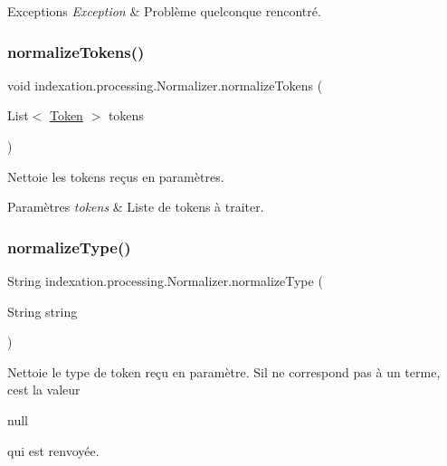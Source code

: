 \begin{DoxyExceptions}{Exceptions}
{\em Exception} & Problème quelconque rencontré. \\
\hline
\end{DoxyExceptions}
\mbox{\label{classindexation_1_1processing_1_1Normalizer_a83b6aafd2e8ed00107c9fcb677190005}} 
\subsubsection{\texorpdfstring{normalize\+Tokens()}{normalizeTokens()}}
{\footnotesize\ttfamily void indexation.\+processing.\+Normalizer.\+normalize\+Tokens (\begin{DoxyParamCaption}\item[{List$<$ \hyperlink{classindexation_1_1content_1_1Token}{Token} $>$}]{tokens }\end{DoxyParamCaption})}

Nettoie les tokens reçus en paramètres.


\begin{DoxyParams}{Paramètres}
{\em tokens} & Liste de tokens à traiter. \\
\hline
\end{DoxyParams}
\mbox{\label{classindexation_1_1processing_1_1Normalizer_ac8fd460c8d0bd9e58605d8eb857c3603}} 
\subsubsection{\texorpdfstring{normalize\+Type()}{normalizeType()}}
{\footnotesize\ttfamily String indexation.\+processing.\+Normalizer.\+normalize\+Type (\begin{DoxyParamCaption}\item[{String}]{string }\end{DoxyParamCaption})}

Nettoie le type de token reçu en paramètre. S\textquotesingle{}il ne correspond pas à un terme, c\textquotesingle{}est la valeur
\begin{DoxyCode}
null 
\end{DoxyCode}
 qui est renvoyée.


